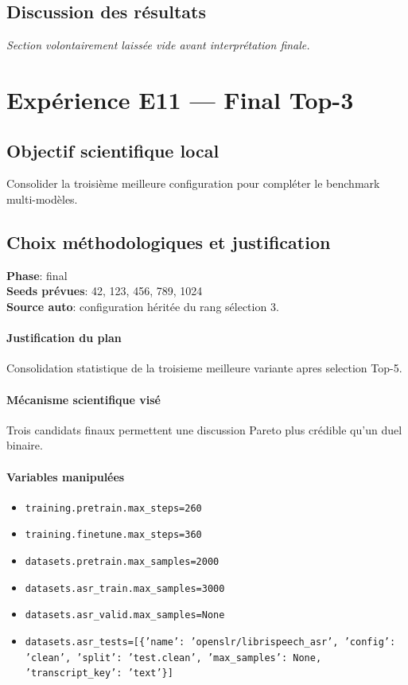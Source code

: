 \documentclass[11pt,a4paper]{article}
\begin{document}
\subsection{Discussion des résultats}
\textit{Section volontairement laissée vide avant interprétation finale.}


\section{Expérience E11 --- Final Top-3}
\subsection{Objectif scientifique local}
Consolider la troisième meilleure configuration pour compléter le benchmark multi-modèles.

\subsection{Choix méthodologiques et justification}
\textbf{Phase}: final\\
\textbf{Seeds prévues}: 42, 123, 456, 789, 1024\\
\textbf{Source auto}: configuration héritée du rang sélection 3.

\paragraph{Justification du plan}
Consolidation statistique de la troisieme meilleure variante apres selection Top-5.

\paragraph{Mécanisme scientifique visé}
Trois candidats finaux permettent une discussion Pareto plus crédible qu'un duel binaire.

\paragraph{Variables manipulées}
\begin{itemize}
\item \texttt{training.pretrain.max\_steps=260}
\item \texttt{training.finetune.max\_steps=360}
\item \texttt{datasets.pretrain.max\_samples=2000}
\item \texttt{datasets.asr\_train.max\_samples=3000}
\item \texttt{datasets.asr\_valid.max\_samples=None}
\item \texttt{datasets.asr\_tests=[\{'name': 'openslr/librispeech\_asr', 'config': 'clean', 'split': 'test.clean', 'max\_samples': None, 'transcript\_key': 'text'\}]}
\end{itemize}
\end{document}
